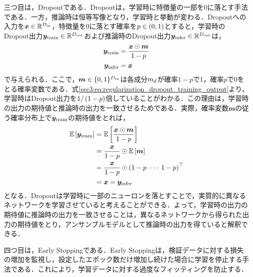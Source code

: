 三つ目は，Dropout\cite{srivastava2014dropout}である．Dropoutは，学習時に特徴量の一部を0に落とす手法である．一方，推論時は恒等写像となり，学習時と挙動が変わる．Dropoutへの入力を$\bm{x} \in \mathbb{R}^{D_{\text{in}}}$，特徴量を0に落とす確率を$p \in \left(0, 1\right)$とすると，学習時のDropout出力$\bm{y}_{\text{train}} \in \mathbb{R}^{D_{\text{out}}}$および推論時のDropout出力$\bm{y}_{\text{infer}} \in \mathbb{R}^{D_{\text{out}}}$は，
\begin{align}
    \bm{y}_{\text{train}} & = \frac{\bm{x} \odot \bm{m}}{1 - p} \label{sec3:eq:regularization_dropout_training_output} \\
    \bm{y}_{\text{infer}} & = \bm{x}
\end{align}
で与えられる．ここで，$\bm{m} \in \{0, 1\}^{D_{\text{in}}}$は各成分$m_{d}$が確率$1 - p$で1，確率$p$で0をとる確率変数である．式\eqref{sec3:eq:regularization_dropout_training_output}より，学習時はDropout出力を$1 / \left(1 - p\right)$倍していることがわかる．この理由は，学習時の出力の期待値と推論時の出力を一致させるためである．実際，確率変数$\bm{m}$の従う確率分布上で$\bm{y}_{\text{train}}$の期待値をとれば，
\begin{align}
    \mathbb{E}\left[\bm{y}_{\text{train}}\right] & = \mathbb{E}\left[\frac{\bm{x} \odot \bm{m}}{1 - p}\right]             \\
                                                   & = \frac{\bm{x}}{1 - p} \odot \mathbb{E}\left[\bm{m}\right]             \\
                                                   & = \frac{\bm{x}}{1 - p} \odot \left(1 - p ~ \cdots ~ 1 - p\right)^\top \\
                                                   & = \bm{x} = \bm{y}_{\text{infer}}
\end{align}
となる．Dropoutは学習時に一部のニューロンを落とすことで，実質的に異なるネットワークを学習させていると考えることができる．よって，学習時の出力の期待値に推論時の出力を一致させることは，異なるネットワークから得られた出力の期待値をとり，アンサンブルモデルとして推論時の出力を得ていると解釈できる．

四つ目は，Early Stoppingである．Early Stoppingは，検証データに対する損失の増加を監視し，設定したエポック数だけ増加し続けた場合に学習を停止する手法である．これにより，学習データに対する過度なフィッティングを防止する．

